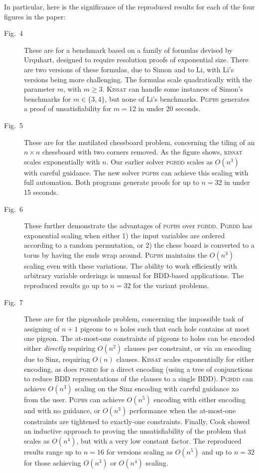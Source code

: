 \documentclass[runningheads]{llncs}
\newcommand{\pgbdd}{{\sffamily\scshape pgbdd}}
\newcommand{\Pgbdd}{{\sffamily\scshape  Pgbdd}}
\newcommand{\pgpbs}{{\sffamily\scshape  pgpbs}}
\newcommand{\Pgpbs}{{\sffamily\scshape  Pgpbs}}
\newcommand{\kissat}{{\sffamily\scshape kissat}}
\newcommand{\Kissat}{{\sffamily\scshape  Kissat}}
\begin{document}
In particular, here is the significance of the reproduced results for
each of the four figures in the paper:
\begin{description}
\item[Fig.~4] These are for a benchmark based on a family of formulas
  devised by Urquhart, designed to require resolution proofs of
  exponential size.  There are two versions of these formulas, due to
  Simon and to Li, with Li's versions being more challenging.  The
  formulas scale quadratically with the parameter $m$, with $m \geq
  3$.  \Kissat{} can handle some instances of Simon's benchmarks for
  $m \in \{3,4\}$, but none of Li's benchmarks.  \Pgpbs{} generates a
  proof of unsatisfiability for $m=12$ in under 20 seconds.

\item[Fig.~5] These are for the mutilated chessboard problem,
  concerning the tiling of an $n \times n$ chessboard with two corners
  removed.  As the figure shows, \kissat{} scales exponentially with
  $n$.  Our earlier solver \pgbdd{} scales as $O(n^3)$ with careful
  guidance.  The new solver \pgpbs{} can achieve this scaling with
  full automation. Both programs  generate proofs for up to
  $n=32$ in under 15 seconds.

\item[Fig.~6] These further demonstrate the advantages of \pgpbs{}
  over \pgbdd{}.  \Pgbdd{} has exponential scaling when either 1) the
  input variables are ordered according to a random permutation, or 2) the chess
  board is converted to a torus by having the ends wrap around.
  \Pgpbs{} maintains the $O(n^3)$ scaling even with these variations.
  The ability to work efficiently with arbitrary variable orderings is
  unusual for BDD-based applications.  The reproduced results go up to
  $n=32$ for the variant problems.

\item[Fig.~7] These are for the pigeonhole problem, concerning the
  impossible task of assigning of $n+1$ pigeons to $n$ holes such that
  each hole contains at most one pigeon.  The at-most-one constraints
  of pigeons to holes can be encoded either {\em directly} requiring
  $O(n^2)$ clauses per constraint, or via an encoding due to Sinz,
  requiring $O(n)$ clauses.  \Kissat{} scales exponentially for either
  encoding, as does \pgbdd{} for a direct encoding (using a tree of conjunctions to reduce BDD representations of the clauses to a single BDD).  \Pgbdd{} can
  achieve $O(n^3)$ scaling on the Sinz encoding with careful guidance
xo  from the user.  \Pgpbs{} can achieve $O(n^5)$ encoding with either
  encoding and with no guidance, or $O(n^3)$ performance when the
  at-most-one constraints are tightened to exactly-one constraints.
  Finally, Cook showed an inductive approach to proving the
  unsatisfiability of the problem that scales as $O(n^4)$, but with a
  very low constant factor.  The reproduced results range up to $n=16$
  for versions scaling as $O(n^5)$ and up to $n=32$ for those achieving
  $O(n^3)$ or $O(n^4)$ scaling.
 
\end{description}
\end{document}
